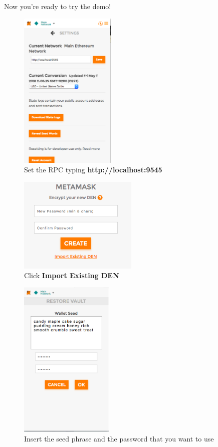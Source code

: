 Now you're ready to try the demo!

\begin{figure}[h]
	\centering
	\includegraphics[height=3in]{img/settings.png}
	\caption{Set the RPC typing \textbf{http://localhost:9545}}
	\label{fig:metamask1}
\end{figure}

\begin{figure}[h]
	\centering
	\includegraphics[height=1.8in]{img/import.png}
	\caption{Click \textbf{Import Existing DEN}}
	\label{fig:metamask2}
\end{figure}

\begin{figure}[h]
	\centering
	\includegraphics[height=3in]{img/stringPsw.png}
	\caption{Insert the seed phrase and the password that you want to use}
	\label{fig:metamask3}
\end{figure}
